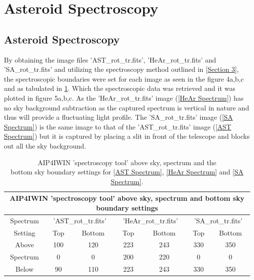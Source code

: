 \documentclass[12pt]{article}
\begin{document}
\section{Asteroid Spectroscopy}
\label{Section 4}
\subsection{Asteroid Spectroscopy}
\label{SubSection 4a}

By obtaining the image files 'AST\_rot\_tr.fits', 'HeAr\_rot\_tr.fits' and 'SA\_rot\_tr.fits' and utilizing the spectroscopy method outlined in \cref{Section 3}, the spectroscopic boundaries were set for each image as seen in the figure 4a,b,c and as tabulated in \cref{Spectrum Settings}. Which the spectroscopic data was retrieved and it was plotted in figure 5a,b,c. As the 'HeAr\_rot\_tr.fits' image (\cref{HeAr Spectrum}) has no sky background subtraction as the captured spectrum is vertical in nature and thus will provide a fluctuating light profile. The 'SA\_rot\_tr.fits' image (\cref{SA Spectrum}) is the same image to that of the 'AST\_rot\_tr.fits' image (\cref{AST Spectrum}) but it is captured by placing a slit in front of the telescope and blocks out all the sky background. \\

\begin{table}[H]
\begin{center}
 \footnotesize
 \begin{tabular}{|c||c|c||c|c||c|c|}
 \hline
 \multicolumn{7}{|c|}{AIP4IWIN 'spectroscopy tool' above sky, spectrum and bottom sky boundary settings} \\
 \hline \hline
 Spectrum & \multicolumn{2}{|c||}{'AST\_rot\_tr.fits'} & \multicolumn{2}{c||}{'HeAr\_rot\_tr.fits'} & \multicolumn{2}{c|}{'SA\_rot\_tr.fits'} \\
 \hline
 Setting & Top & Bottom & Top & Bottom & Top & Bottom \\
 \hline \hline
 Above & 100 & 120 & 223 & 243 & 330 & 350 \\
 \hline
 Spectrum & 0 & 0 & 200 & 220 & 0 & 0 \\
 \hline
 Below & 90 & 110 & 223 & 243 & 330 & 350 \\
 \hline
 \end{tabular} \\ 
 \caption{AIP4IWIN 'spectroscopy tool' above sky, spectrum and the \\ bottom sky boundary settings for \cref{AST Spectrum}, \cref{HeAr Spectrum} and \cref{SA Spectrum}.}
 \label{Spectrum Settings}
\end{center}
\end{table} 
\end{document}

